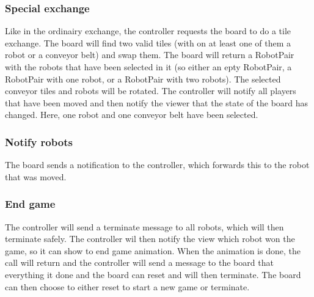 	

	\subsubsection{Special exchange}
	Like in the ordinairy exchange, the controller requests the board to do a tile exchange. The board will find two valid tiles (with on at least one of them a robot or a conveyor belt) and swap them. The board will return a RobotPair with the robots that have been selected in it (so either an epty RobotPair, a RobotPair with one robot, or a RobotPair with two robots). The selected conveyor tiles and robots will be rotated. The controller will notify all players that have been moved and then notify the viewer that the state of the board has changed. Here, one robot and one conveyor belt have been selected.

	
	
	\subsubsection{Notify robots}
	The board sends a notification to the controller, which forwards this to the robot that was moved.	

	

	\subsubsection{End game}
	The controller will send a terminate message to all robots, which will then terminate safely. The controller wil then notify the view which robot won the game, so it can show to end game animation. When the animation is done, the call will return and the controller will send a message to the board that everything it done and the board can reset and will then terminate. The board can then choose to either reset to start a new game or terminate.

	
